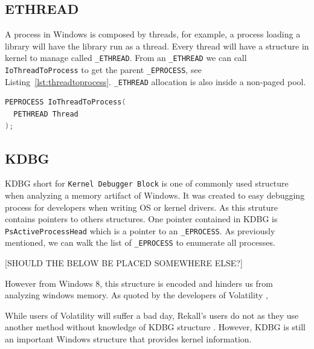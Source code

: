 \subsection[ETHREAD]{ETHREAD}

A process in Windows is composed by threads, for example, a process loading a library will have the library run as a thread. Every thread will have a structure in kernel to manage called \texttt{\_ETHREAD}. From an \texttt{\_ETHREAD} we can call \texttt{IoThreadToProcess} to get the parent \texttt{\_EPROCESS}, see Listing~\ref{lst:threadtoprocess}. \texttt{\_ETHREAD} allocation is also inside a non-paged pool.

\begin{lstlisting}[language=c,caption={IoThreadToProcess},label={lst:threadtoprocess}]
PEPROCESS IoThreadToProcess(
  PETHREAD Thread
);
\end{lstlisting}

\subsection[KDBG]{KDBG}

KDBG short for \texttt{Kernel Debugger Block} is one of commonly used structure when analyzing a memory artifact of Windows. It was created to easy debugging process for developers when writing OS or kernel drivers. As this struture contains pointers to others structures. One pointer contained in KDBG is \texttt{PsActiveProcessHead} which is a pointer to an \texttt{\_EPROCESS}. As previously mentioned, we can walk the list of \texttt{\_EPROCESS} to enumerate all processes.

[SHOULD THE BELOW BE PLACED SOMEWHERE ELSE?]

However from Windows 8, this structure is encoded and hinders us from analyzing windows memory. As quoted by the developers of Volatility \cite{kdbgEncoded},


While users of Volatility will suffer a bad day, Rekall's users do not as they use another method without knowledge of KDBG structure \cite{rekallOnKDBGEncoding}. However, KDBG is still an important Windows structure that provides kernel information.

